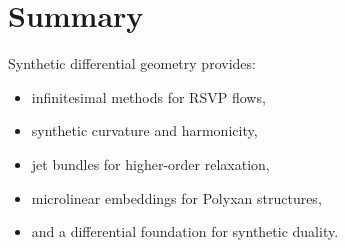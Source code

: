 \section{Summary}

Synthetic differential geometry provides:
\begin{itemize}
\item infinitesimal methods for RSVP flows,
\item synthetic curvature and harmonicity,
\item jet bundles for higher-order relaxation,
\item microlinear embeddings for Polyxan structures,
\item and a differential foundation for synthetic duality.
\end{itemize}


